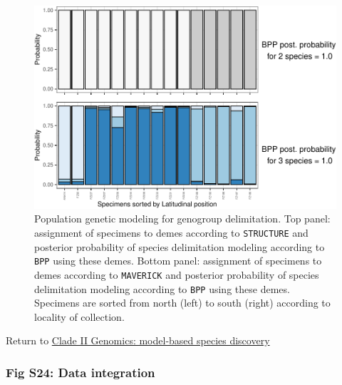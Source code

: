 \documentclass[
  11pt,
]{article}
\begin{document}
\begin{figure}
\includegraphics{Supplementary_Material_files/figure-latex/cladeIImolecularDelimitationPopGenBpp-1} \caption{Population genetic modeling for genogroup delimitation. Top panel: assignment of specimens to demes according to \texttt{STRUCTURE} and posterior probability of species delimitation modeling according to \texttt{BPP} using these demes. Bottom panel: assignment of specimens to demes according to \texttt{MAVERICK} and posterior probability of species delimitation modeling according to \texttt{BPP} using these demes. Specimens are sorted from north (left) to south (right) according to locality of collection.}\label{fig:cladeIImolecularDelimitationPopGenBpp}
\end{figure}

Return to \protect\hyperlink{model-based-species-discovery-3}{Clade II Genomics: model-based species discovery}
\pagebreak

\hypertarget{fig-s24-data-integration}{%
\subsubsection{Fig S24: Data integration}\label{fig-s24-data-integration}}
\end{document}
